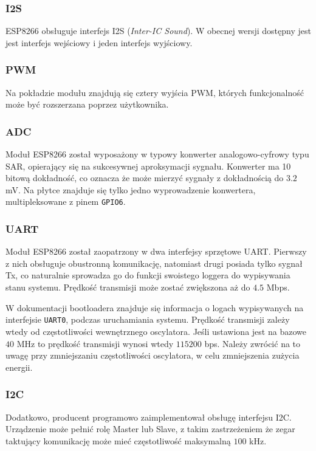 \subsubsection{I2S}
\label{i2s}
ESP8266 obsługuje interfejs I2S (\textit{Inter-IC Sound}). W obecnej wersji dostępny
jest jest interfejs wejściowy i jeden interfejs wyjściowy.

\subsubsection{PWM}
\label{pwm}
Na pokładzie modułu znajdują się cztery wyjścia PWM, których funkcjonalność może
być rozszerzana poprzez użytkownika.

\subsubsection{ADC}
Moduł ESP8266 został wyposażony w typowy konwerter analogowo-cyfrowy typu SAR, opierający
się na sukcesywnej aproksymacji sygnału. Konwerter ma 10 bitową dokładność, co oznacza
że może mierzyć sygnały z dokładnością do $\num{3.2}$ \si{mV}. Na płytce znajduje się
tylko jedno wyprowadzenie konwertera, multipleksowane z pinem \verb+GPIO6+.

\subsubsection{UART}
Moduł ESP8266 został zaopatrzony w dwa interfejsy sprzętowe UART. Pierwszy z nich
obsługuje obustronną komunikację, natomiast drugi posiada tylko sygnał Tx, co naturalnie
sprowadza go do funkcji swoistego loggera do wypisywania stanu systemu. Prędkość transmisji
może zostać zwiększona aż do $\num{4.5}$ Mbps. 

W dokumentacji bootloadera znajduje się informacja o logach wypisywanych 
na interfejsie \verb+UART0+, podczas uruchamiania systemu. 
Prędkość transmisji zależy wtedy od częstotliwości
wewnętrznego oscylatora. Jeśli ustawiona jest na bazowe $\num{40}$ \si{MHz} to 
prędkość transmisji wynosi wtedy $\num{115200}$ bps. Należy zwrócić na to uwagę
przy zmniejszaniu częstotliwości oscylatora, w celu zmniejszenia zużycia energii.

\subsubsection{I2C}
Dodatkowo, producent programowo zaimplementował obsługę interfejsu I2C. 
Urządzenie może pełnić rolę Master lub Slave, z takim zastrzeżeniem że zegar
taktujący komunikację może mieć częstotliwość maksymalną $\num{100}$ \si{kHz}.\\



